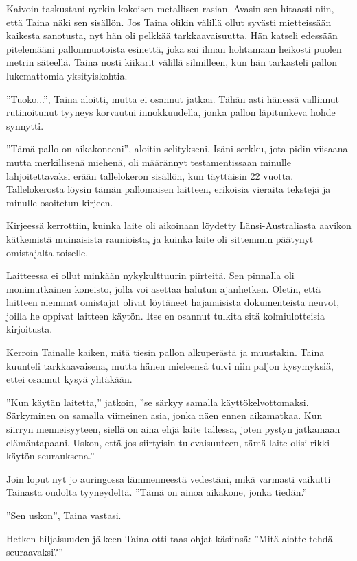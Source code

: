 ﻿\documentclass[a4paper, 12pt, finnish]{article}
\newcommand{\q}[1]{''#1''}
\begin{document}
Kaivoin taskustani nyrkin kokoisen metallisen rasian. Avasin sen
hitaasti niin, että Taina näki sen sisällön. Jos Taina olikin välillä
ollut syvästi mietteissään kaikesta sanotusta, nyt hän oli
pelkkää tarkkaavaisuutta. Hän katseli edessään pitelemääni
pallonmuotoista esinettä, joka sai ilman hohtamaan heikosti
puolen metrin säteellä. Taina nosti kiikarit välillä silmilleen,
kun hän tarkasteli pallon lukemattomia yksityiskohtia.

\q{Tuoko...}, Taina aloitti, mutta ei osannut jatkaa.
Tähän asti hänessä vallinnut rutinoitunut tyyneys
korvautui innokkuudella, jonka pallon läpitunkeva hohde synnytti.

\q{Tämä pallo on aikakoneeni}, aloitin selitykseni.
Isäni serkku, jota pidin viisaana mutta merkillisenä
miehenä, oli määrännyt testamentissaan minulle
lahjoitettavaksi erään tallelokeron sisällön,
kun täyttäisin 22 vuotta. Tallelokerosta
löysin tämän pallomaisen laitteen, erikoisia vieraita
tekstejä ja minulle osoitetun kirjeen.

Kirjeessä kerrottiin, kuinka laite oli aikoinaan löydetty
Länsi-Australiasta aavikon kätkemistä muinaisista raunioista,
ja kuinka laite oli sittemmin päätynyt omistajalta toiselle.

Laitteessa ei ollut minkään nykykulttuurin piirteitä.
Sen pinnalla oli monimutkainen koneisto,
jolla voi asettaa halutun ajanhetken. Oletin,
että laitteen aiemmat omistajat olivat löytäneet hajanaisista
dokumenteista neuvot, joilla he oppivat laitteen käytön.
Itse en osannut tulkita sitä kolmiulotteisia kirjoitusta.

Kerroin Tainalle kaiken, mitä tiesin pallon alkuperästä ja muustakin.
Taina kuunteli tarkkaavaisena, mutta hänen mieleensä tulvi niin paljon
kysymyksiä, ettei osannut kysyä yhtäkään.

\q{Kun käytän laitetta,} jatkoin, \q{se särkyy samalla käyttökelvottomaksi.
Särkyminen on samalla viimeinen asia, jonka näen ennen aikamatkaa.
Kun siirryn menneisyyteen, siellä on aina ehjä laite tallessa,
joten pystyn jatkamaan elämäntapaani. Uskon, että jos siirtyisin
tulevaisuuteen, tämä laite olisi rikki käytön seurauksena.}

Join loput nyt jo auringossa lämmenneestä vedestäni,
mikä varmasti vaikutti Tainasta oudolta tyyneydeltä.
\q{Tämä on ainoa aikakone, jonka tiedän.}

\q{Sen uskon}, Taina vastasi.

Hetken hiljaisuuden jälkeen Taina otti taas ohjat käsiinsä:
\q{Mitä aiotte tehdä seuraavaksi?}
\end{document}
